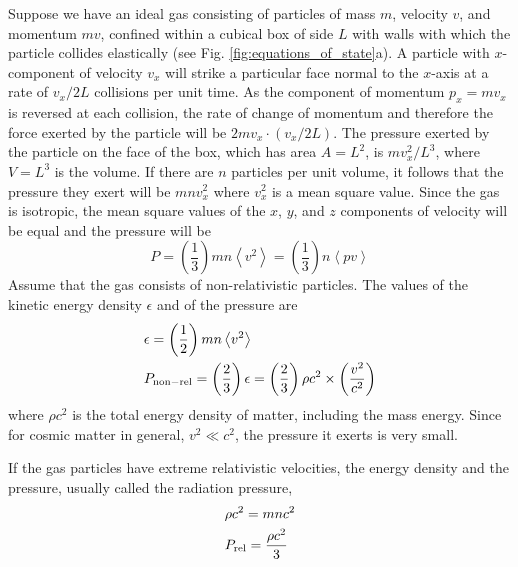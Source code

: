 \documentclass[12pt,a4paper]{article}
\begin{document}
Suppose we have an ideal gas consisting of particles of mass $m$, velocity $v$, and momentum $mv$, confined within a cubical box of side $L$ with walls with which the particle collides elastically (see Fig. \ref{fig:equations_of_state}a). A particle with $x$-component of velocity $v_x$ will strike a particular face normal to the $x$-axis at a rate of $v_x/2L$ collisions per unit time. As the component of momentum $p_x = mv_x$ is reversed at each collision, the rate of change of momentum and therefore the force exerted by the particle will be $2mv_x \cdot (v_x/2L)$. The pressure exerted by the particle on the face of the box, which has area $A = L^2$, is $mv_x^2/L^3$, where $V = L^3$ is the volume. If there are $n$ particles per unit volume, it follows that the pressure they exert will be $mnv_x^2$ where $v_x^2$ is a mean square value. Since the gas is isotropic, the mean square values of the $x$, $y$, and $z$ components of velocity will be equal and the pressure will be
\begin{equation}
P = \left( \dfrac{1}{3} \right) mn \left\langle v^2 \right\rangle = \left( \dfrac{1}{3} \right) n \left\langle p v \right\rangle
\end{equation}
Assume that the gas consists of non-relativistic particles. The values of the kinetic energy density $\epsilon$ and of the pressure are
\begin{align}
& \epsilon = \left( \dfrac{1}{2} \right) mn \left\langle v^2 \right\rangle \\
& P_{\rm non-rel} = \left( \dfrac{2}{3} \right) \epsilon = \left( \dfrac{2}{3} \right) \rho c^2 \times  \left( \dfrac{v^2}{c^2} \right)
\end{align}
where $\rho c^2$ is the total energy density of matter, including the mass energy. Since for cosmic matter in general, $v^2 \ll c^2$, the pressure it exerts is very small.

If the gas particles have extreme relativistic velocities, the energy density and the pressure, usually called the radiation pressure, 
\begin{align}
& \rho c^2 =  mn  c^2  \\
& P_{\rm rel} = \dfrac{\rho c^2}{3} 
\end{align}
\end{document}
